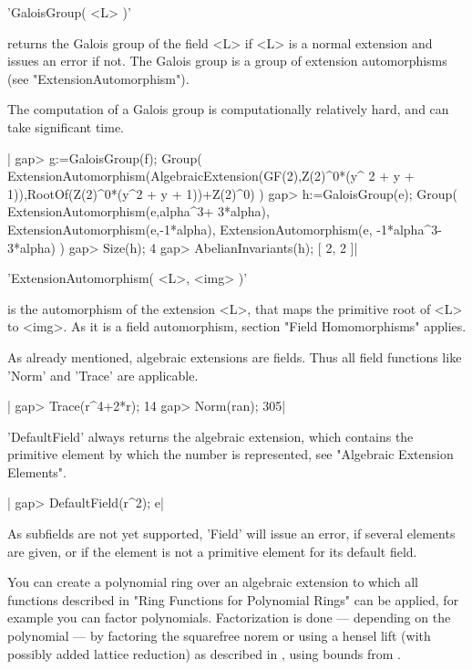 'GaloisGroup( <L> )'

returns the Galois group of the field <L> if <L> is a normal extension
and issues an error if not.  The Galois group is a group of extension
automorphisms (see "ExtensionAutomorphism").

The computation of a Galois group is computationally relatively hard,
and can take significant time.

|    gap> g:=GaloisGroup(f);
    Group( ExtensionAutomorphism(AlgebraicExtension(GF(2),Z(2)^0*(y^
    2 + y + 1)),RootOf(Z(2)^0*(y^2 + y + 1))+Z(2)^0) )
    gap> h:=GaloisGroup(e);
    Group( ExtensionAutomorphism(e,alpha^3+
    3*alpha), ExtensionAutomorphism(e,-1*alpha), ExtensionAutomorphism(e,
    -1*alpha^3-3*alpha) )
    gap> Size(h);
    4
    gap> AbelianInvariants(h);
    [ 2, 2 ]|


'ExtensionAutomorphism( <L>, <img> )'

is the automorphism of the extension <L>, that maps the primitive root of
<L> to <img>.  As it is a field automorphism, section "Field
Homomorphisms" applies.


As already mentioned, algebraic extensions are fields.  Thus all field
functions like 'Norm' and 'Trace' are applicable.

|    gap> Trace(r^4+2*r);
    14
    gap> Norm(ran);
    305|

'DefaultField' always returns the algebraic extension, which contains the
primitive element by which the number is represented, see "Algebraic
Extension Elements".

|    gap> DefaultField(r^2);
    e|

As subfields are not yet supported, 'Field' will issue an error, if
several elements are given, or if the element is not a primitive element
for its default field.

You can create a polynomial ring over an algebraic extension to which all
functions described in "Ring Functions for Polynomial Rings" can be
applied, for example you can factor polynomials.  Factorization is done
--- depending on the polynomial --- by factoring the squarefree norem or
using a hensel lift (with possibly added lattice reduction) as described
in \cite{Abb89}, using bounds from \cite{BTW93}.

